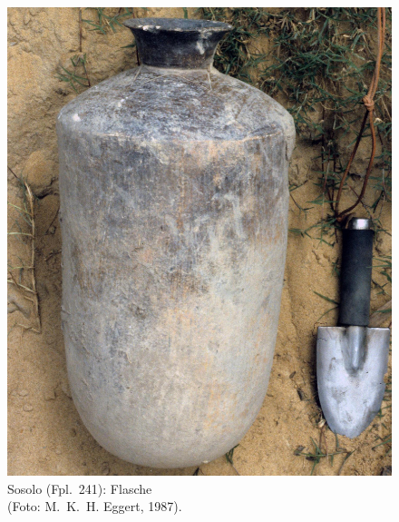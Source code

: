 \begin{figure}[p]
\begin{minipage}[b]{\columnwidth}
		\includegraphics[width=\textwidth]{fig/SSL87-101_Sosolo-SanghaFkm71_E87-05-4.jpg}
		\caption{Sosolo (Fpl.~241): Flasche\\(Foto: M.~K.~H. Eggert, 1987).}
		\label{fig:SSL87-101_Flasche_Foto}
	\end{minipage}
\end{figure}

